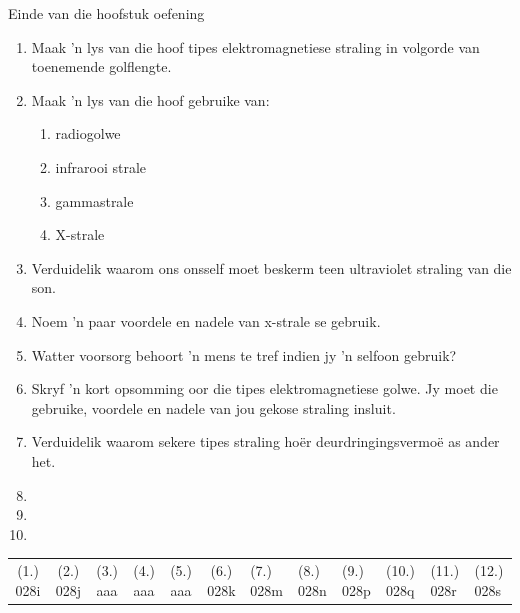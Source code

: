 \begin{eocexercises}{Einde van die hoofstuk oefening}
\begin{enumerate}[noitemsep, label=\textbf{\arabic*}. ]
    \item Maak 'n lys van die hoof tipes elektromagnetiese straling in volgorde van toenemende golflengte.\newline
    \item Maak 'n lys van die hoof gebruike van:
\begin{enumerate}[noitemsep, label=\textbf{\alph*}. ] 
    \item radiogolwe
    \item infrarooi strale
    \item gammastrale
    \item X-strale
\end{enumerate}
\item Verduidelik waarom ons onsself moet beskerm teen ultraviolet straling van die son. \newline
\item Noem 'n paar voordele en nadele van x-strale se gebruik. \newline
\item Watter voorsorg behoort 'n mens te tref indien jy 'n selfoon gebruik? \newline
\item Skryf 'n kort opsomming oor die tipes elektromagnetiese golwe. Jy moet die gebruike, voordele en nadele van jou gekose straling insluit.\newline
\item Verduidelik waarom sekere tipes straling ho\"er deurdringingsvermo\"e as ander het.
\item
\item
\item
\end{enumerate}
  \label{m38779**end}
  \label{459e2bef85baf867f5850bc8338cad3a**end}
\practiceinfo
 \par \begin{tabular}[h]{cccccc}
 (1.) 028i  &  (2.) 028j  & (3.) aaa & (4.) aaa & (5.) aaa & (6.) 028k  &  (7.) 028m  &  (8.) 028n  &  (9.) 028p  &  (10.) 028q  &  (11.) 028r  &  (12.) 028s  

\end{tabular}
\end{eocexercises}
